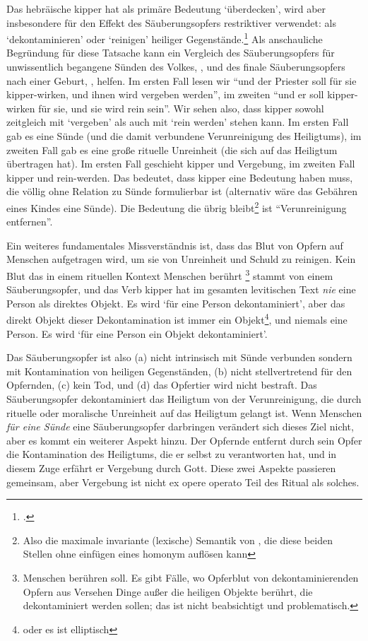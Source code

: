 Das hebräische kipper hat als primäre Bedeutung `überdecken', wird aber insbesondere für den Effekt des Säuberungsopfers restriktiver verwendet:
als `dekontaminieren' oder `reinigen' heiliger Gegenstände.\Footcite[4]{lamb-of-the-free}
Als anschauliche Begründung für diese Tatsache kann ein Vergleich des
Säuberungsopfers für unwissentlich begangene Sünden des Volkes, ,
und des finale Säuberungsopfers nach einer Geburt, , helfen.
Im ersten Fall lesen wir ``und der Priester soll für sie kipper-wirken, und ihnen wird vergeben werden'', im zweiten ``und er soll kipper-wirken für sie, und sie wird rein sein''.
Wir sehen also, dass kipper sowohl zeitgleich mit `vergeben' als auch mit `rein werden' stehen kann.
Im ersten Fall gab es eine Sünde (und die damit verbundene Verunreinigung des Heiligtums), im zweiten Fall gab es eine große rituelle Unreinheit (die sich auf das Heiligtum übertragen hat).
Im ersten Fall geschieht kipper und Vergebung, im zweiten Fall kipper und rein-werden.
Das bedeutet, dass kipper eine Bedeutung haben muss, die völlig ohne Relation zu Sünde formulierbar ist (alternativ wäre das Gebähren eines Kindes eine Sünde).
Die Bedeutung die übrig bleibt\footnote{Also die maximale invariante (lexische) Semantik von \kipper, die diese beiden Stellen ohne einfügen eines homonym auflösen kann} ist ``Verunreinigung entfernen''.

Ein weiteres fundamentales Missverständnis ist, dass das Blut von Opfern auf Menschen aufgetragen wird, um sie von Unreinheit und Schuld zu reinigen.
Kein Blut das in einem rituellen Kontext Menschen berührt
\footnote{Menschen berühren soll. Es gibt Fälle, wo Opferblut von dekontaminierenden Opfern aus Versehen Dinge außer die heiligen Objekte berührt, die dekontaminiert werden sollen; das ist nicht beabsichtigt und problematisch.}
stammt von einem Säuberungsopfer, und das Verb kipper hat im gesamten levitischen Text \textit{nie} eine Person als direktes Objekt.
Es wird `für eine Person dekontaminiert', aber das direkt Objekt dieser Dekontamination ist immer ein Objekt\footnote{oder es ist elliptisch}, und niemals eine Person.
Es wird `für eine Person ein Objekt dekontaminiert'.

Das Säuberungsopfer ist also (a) nicht intrinsisch mit Sünde verbunden sondern mit Kontamination von heiligen Gegenständen, (b) nicht stellvertretend für den Opfernden, (c) kein Tod, und (d) das Opfertier wird nicht bestraft.
Das Säuberungsopfer dekontaminiert das Heiligtum von der Verunreinigung, die durch rituelle oder moralische Unreinheit auf das Heiligtum gelangt ist.
Wenn Menschen \textit{für eine Sünde} eine Säuberungsopfer darbringen verändert sich dieses Ziel nicht, aber es kommt ein weiterer Aspekt hinzu.
Der Opfernde entfernt durch sein Opfer die Kontamination des Heiligtums, die er selbst zu verantworten hat, und in diesem Zuge erfährt er Vergebung durch Gott.
Diese zwei Aspekte passieren gemeinsam, aber Vergebung ist nicht ex opere operato Teil des Ritual als solches.

